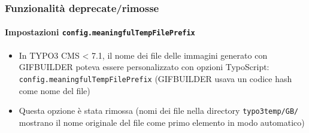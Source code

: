 
\begin{frame}[fragile]
	\frametitle{Funzionalità deprecate/rimosse}
	\framesubtitle{Impostazioni \texttt{config.meaningfulTempFilePrefix}}

	\begin{itemize}

		\item In TYPO3 CMS < 7.1, il nome dei file delle immagini generato con GIFBUILDER poteva essere
			personalizzato con opzioni TypoScript:\newline
			\texttt{config.meaningfulTempFilePrefix}\newline
			\small
				(GIFBUILDER usava un codice hash come nome del file)
			\normalsize

		\item Questa opzione è stata rimossa (nomi dei file nella directory \texttt{typo3temp/GB/}
			mostrano il nome originale del file come primo elemento in modo automatico)

	\end{itemize}

\end{frame}




